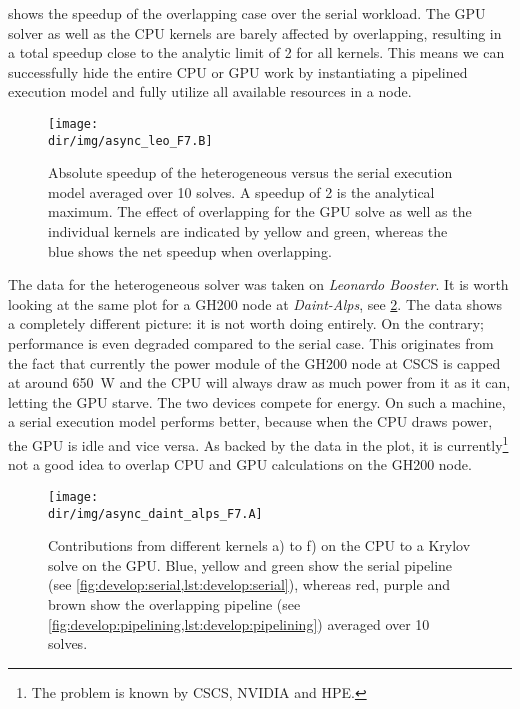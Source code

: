  shows the speedup of the overlapping case over the serial workload.
The GPU solver as well as the CPU kernels are barely affected by overlapping, resulting in a total speedup close to the analytic limit of \num{2} for all kernels.
This means we can successfully hide the entire CPU or GPU work by instantiating a pipelined execution model and fully utilize all available resources in a node.
\begin{figure}
\centering
\texttt{[image: \\dir/img/async\_leo\_F7.B]}
\caption{
Absolute speedup of the heterogeneous versus the serial execution model averaged over \num{10} solves.
A speedup of \num{2} is the analytical maximum.
The effect of overlapping for the GPU solve as well as the individual kernels are indicated by yellow and green, whereas the blue shows the net speedup when overlapping.
}
\label{fig:async:F7:leo:speedup}
\end{figure}

The data for the heterogeneous solver was taken on \emph{Leonardo Booster}.
It is worth looking at the same plot for a GH200 node at \emph{Daint-Alps}, see \cref{fig:async:F7:daint:bar}.
The data shows a completely different picture: it is not worth doing entirely.
On the contrary; performance is even degraded compared to the serial case.
This originates from the fact that currently the power module of the GH200 node at CSCS is capped at around \SI{650}{\watt} and the CPU will always draw as much power from it as it can, letting the GPU starve.
The two devices compete for energy.
On such a machine, a serial execution model performs better, because when the CPU draws power, the GPU is idle and vice versa.
As backed by the data in the plot, it is currently\footnote{The problem is known by CSCS, NVIDIA and HPE.} not a good idea to overlap CPU and GPU calculations on the GH200 node.
\begin{figure}
    \centering
    \texttt{[image: \\dir/img/async\_daint\_alps\_F7.A]}
    \caption{Contributions from different kernels a) to f) on the CPU to a Krylov solve on the GPU. Blue, yellow and green show the serial pipeline (see \cref{fig:develop:serial,lst:develop:serial}), whereas red, purple and brown show the overlapping pipeline (see \cref{fig:develop:pipelining,lst:develop:pipelining}) averaged over \num{10} solves. }
    \label{fig:async:F7:daint:bar}
\end{figure}

